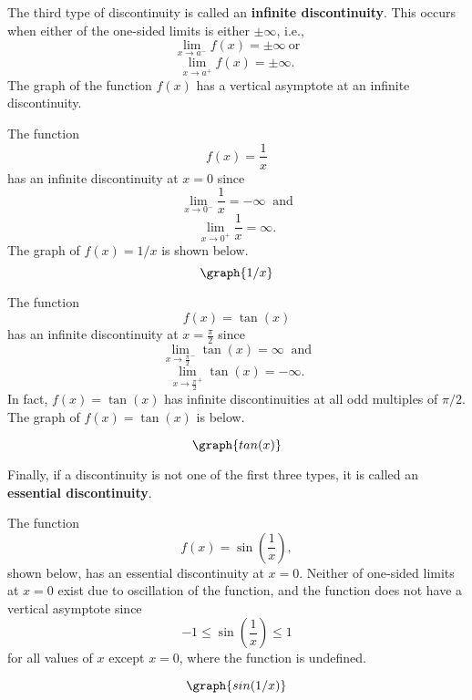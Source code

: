\documentclass{ximera}
\begin{document}
The third type of discontinuity is called an \textbf{infinite discontinuity}. 
This occurs when either of the one-sided limits is either $\pm \infty$, i.e., 
\[\lim_{x \to a^-} f(x) = \pm\infty \ \text{or}  \]
\[\lim_{x \to a^+} f(x) = \pm\infty. \]
The graph of the function $f(x)$ has a vertical asymptote at an infinite discontinuity.


\begin{example}[example 5]
The function 
\[
f(x) = \frac{1}{x}
\]
  has an infinite discontinuity at $x=0$ since
\[\lim_{x \to 0^-} \frac{1}{x} = -\infty \ \text {  and}\]
\[\lim_{x \to 0^+} \frac{1}{x} = \infty.\]
The graph of $f(x) = 1/x$ is shown below.
\[
\graph{1/x}
\]
\end{example}


\begin{example}[example 6]
The function 
\[
f(x) = \tan(x)
\]
 has an infinite discontinuity at $x = \frac{\pi}{2}$
since
\[\lim_{x \to \frac{\pi}{2}^-} \tan(x) = \infty \ \text {  and}\]
\[\lim_{x \to \frac{\pi}{2}^+} \tan(x) = -\infty.\]
In fact, $f(x) = \tan(x)$ has infinite discontinuities at all odd multiples of $\pi/2$. 
The graph of $f(x) = \tan(x)$ is below.

\[
\graph{tan(x)}
\]

\end{example}


Finally, if a discontinuity is not one of the first three types, it is called an 
\textbf{essential discontinuity}.


\begin{example}[example 7] The function 
\[
f(x) = \sin \left(\frac{1}{x}\right),
\]
 shown below, has an essential discontinuity at $x = 0$.
Neither of one-sided limits at $x=0$ exist due to oscillation of the function, 
and the function does not have a vertical asymptote since 
\[-1 \leq \sin\left(\frac{1}{x}\right) \leq 1 \]
for all values of $x$ except $x = 0$, where the function is undefined.

\[
\graph{sin(1/x)}
\]
\end{example}


\end{document}
